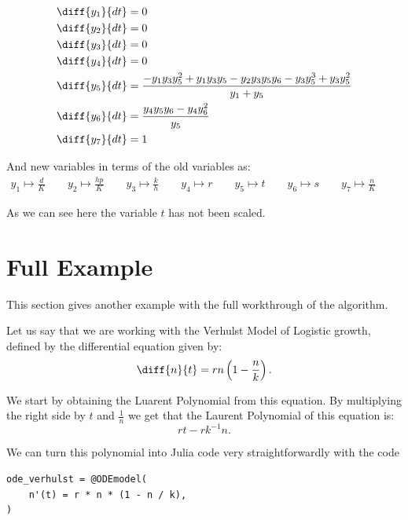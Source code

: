\documentclass[oneside, a4paper, onecolumn, 11pt]{article}
\begin{document}
\begin{align*}
    \diff{y_1}{dt} & = 0                                                                                        \\
    \diff{y_2}{dt} & = 0                                                                                        \\
    \diff{y_3}{dt} & = 0                                                                                        \\
    \diff{y_4}{dt} & = 0                                                                                        \\
    \diff{y_5}{dt} & = \frac{-y_1 y_3 y_5^2 + y_1 y_3 y_5 - y_2 y_3 y_5 y_6 - y_3 y_5^3 + y_3 y_5^2}{y_1 + y_5} \\
    \diff{y_6}{dt} & = \frac{y_4 y_5 y_6 - y_4 y_6^2}{y_5}                                                      \\
    \diff{y_7}{dt} & = 1                                                                                        \\
\end{align*}

And new variables in terms of the old variables as:
\begin{align*}
    y_1 \mapsto \frac{d}{K} \qquad
    y_2 \mapsto \frac{h p}{K} \qquad
    y_3 \mapsto \frac{k}{h} \qquad
    y_4 \mapsto r \qquad
    y_5 \mapsto t \qquad
    y_6 \mapsto s \qquad
    y_7 \mapsto \frac{n}{K} \qquad
\end{align*}

As we can see here the variable \(t\) has not been scaled.

\section{Full Example}

This section gives another example with the full workthrough of the algorithm.

Let us say that we are working with the Verhulst Model of Logistic growth, defined by the differential equation given by:
\[
    \diff{n}{t} = rn \left( 1 - \frac{n}{k} \right).
\]

We start by obtaining the Luarent Polynomial from this equation. By multiplying the right side by \(t\) and \(\frac{1}{n}\) we get that the Laurent Polynomial of this equation is:
\[
    r t - r k^{-1} n.
\]

We can turn this polynomial into Julia code very straightforwardly with the code
\begin{lstlisting}
ode_verhulst = @ODEmodel(
    n'(t) = r * n * (1 - n / k),
)
\end{lstlisting}
\end{document}
